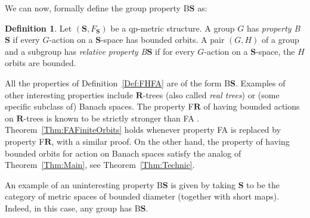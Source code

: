 \documentclass[a4paper]{article}
\theoremstyle{definition}
\newtheorem{defn}[lem]{Definition}
\newcommand*{\BS}{B$\mathbf{S}$}
\begin{document}
We can now, formally define the group property \BS{} as:
%
\begin{defn}\label{Def:PropBS}
Let $(\mathbf S,F_{\mathbf S})$ be a qp-metric structure.
A group $G$ has \emph{property \BS} if every $G$-action on a $\mathbf S$-space has bounded orbits.
A pair $(G,H)$ of a group and a subgroup has \emph{relative property \BS} if for every $G$-action on a $\mathbf S$-space, the $H$ orbits are bounded.
\end{defn}
%
%
All the properties of Definition~\ref{Def:FHFA} are of the form \BS.
Examples of other interesting properties include $\mathbf{R}$-trees (also called \emph{real trees}) or (some specific subclass of) Banach spaces.
The property F$\mathbf{R}$ of having bounded actions on $\mathbf{R}$-trees is known to be strictly stronger than FA \cite{MR3465847}. Theorem~\ref{Thm:FAFiniteOrbits} holds whenever property FA is replaced by property F$\mathbf{R}$, with a similar proof.
On the other hand, the property of having bounded orbits for action on Banach spaces satisfy the analog of Theorem~\ref{Thm:Main}, see Theorem~\ref{Thm:Technic}.

An example of an uninteresting property \BS{} is given by taking $\mathbf{S}$ to be the category of metric spaces of bounded diameter (together with short maps). Indeed, in this case, any group has \BS.
\end{document}
